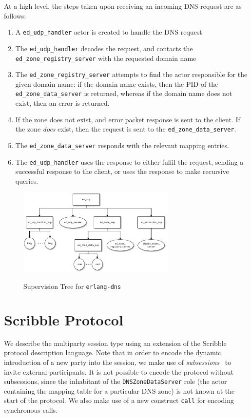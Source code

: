 \documentclass[a4paper]{article}
\begin{document}
At a high level, the steps taken upon receiving an incoming DNS request are as follows:

\begin{enumerate}
\item A \texttt{ed\_udp\_handler} actor is created to handle the DNS request
\item The \texttt{ed\_udp\_handler} decodes the request, and contacts the \texttt{ed\_zone\_registry\_server} with the requested domain name
\item The \texttt{ed\_zone\_registry\_server} attempts to find the actor responsible for the given domain name: if the domain name exists, then the PID of the \texttt{ed\_zone\_data\_server} is returned, whereas if the domain name does not exist, then an error is returned.
\item If the zone does not exist, and error packet response is sent to the client. If the zone \emph{does} exist, then the request is sent to the \texttt{ed\_zone\_data\_server}.
\item The \texttt{ed\_zone\_data\_server} responds with the relevant mapping entries.
\item The \texttt{ed\_udp\_handler} uses the response to either fulfil the request, sending a successful response to the client, or uses the response to make recursive queries.
\end{enumerate}

\begin{figure}
\centering
\includegraphics[width=0.7\textwidth]{Erlang-DNS-Tree.pdf}
\label{edns-supervision-tree}
\caption{Supervision Tree for \texttt{erlang-dns}}
\end{figure}

\section{Scribble Protocol}
We describe the multiparty session type using an extension of the Scribble~\cite{honda:scribble,scribblespec} protocol description language. Note that in order to encode the dynamic introduction of a new party into the session, we make use of \emph{subsessions}~\cite{demangeon:subsessions} to invite external participants. 
It is not possible to encode the protocol without subsessions, since the inhabitant of the \texttt{DNSZoneDataServer} role (the actor containing the mapping table for a particular DNS zone) is not known at the start of the protocol.
We also make use of a new construct \texttt{call} for encoding synchronous calls.
\end{document}
